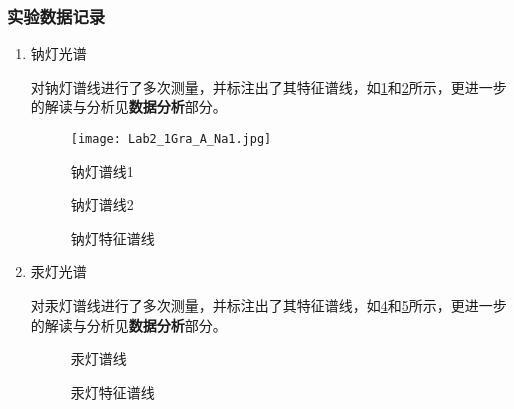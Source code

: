\documentclass[dvipsnames, svgnames,a4paper,11pt]{article}
\begin{document}
	\subsubsection{实验数据记录}
	\begin{enumerate}
		\item 钠灯光谱
		
		对钠灯谱线进行了多次测量，并标注出了其特征谱线，如\cref{fig:figA1}和\cref{fig:figA2}所示，更进一步的解读与分析见\textbf{数据分析}部分。
		
		\begin{figure}[htbp]
			\centering
			\texttt{[image: Lab2\_1Gra\_A\_Na1.jpg]}
			\caption{钠灯谱线1}
			\label{fig:figA1}
		\end{figure}
		
		\begin{figure}[htbp]
			\centering
			\caption{钠灯谱线2}
			\label{fig:figA2}			
		\end{figure}
		
		\begin{figure}[htbp]
			\centering
			\caption{钠灯特征谱线}
			\label{fig:figA3}			
		\end{figure}
		
		\item 汞灯光谱
		
		对汞灯谱线进行了多次测量，并标注出了其特征谱线，如\cref{fig:figA4}和\cref{fig:figA5}所示，更进一步的解读与分析见\textbf{数据分析}部分。
		
		\begin{figure}[htbp]
			\centering
			\caption{汞灯谱线}
			\label{fig:figA4}			
		\end{figure}
		
		\begin{figure}[htbp]
			\centering
			\caption{汞灯特征谱线}
			\label{fig:figA5}			
		\end{figure}
		

\end{enumerate}
\end{document}
